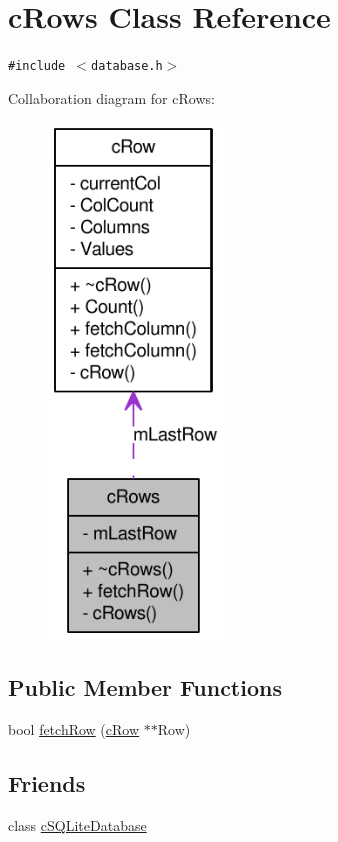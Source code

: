 \hypertarget{classcRows}{
\section{cRows Class Reference}
\label{classcRows}
}
{\tt \#include $<$database.h$>$}

Collaboration diagram for cRows:\nopagebreak
\begin{figure}[H]
\begin{center}
\leavevmode
\includegraphics[width=133pt]{classcRows__coll__graph}
\end{center}
\end{figure}
\subsection*{Public Member Functions}
\begin{CompactItemize}
\item 
bool \hyperlink{classcRows_03a454862807c81280fd7b87b35ba19e}{fetchRow} (\hyperlink{classcRow}{cRow} $\ast$$\ast$Row)
\end{CompactItemize}
\subsection*{Friends}
\begin{CompactItemize}
\item 
\hypertarget{classcRows_224b94ad297724d01a0ad06388446137}{
class \hyperlink{classcRows_224b94ad297724d01a0ad06388446137}{cSQLiteDatabase}}
\label{classcRows_224b94ad297724d01a0ad06388446137}

\end{CompactItemize}


